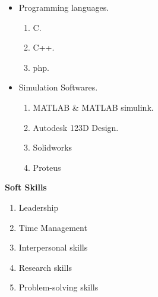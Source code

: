 \documentclass[11pt]{article}
\begin{document}
\begin{itemize}
\vspace{-0.60in}	                                     		\addtolength{\itemindent}{1in}	                                     \item Programming languages.
{\begin{enumerate}
\addtolength{\itemindent}{1.359in}                             		\item C.
\item C++.
\item php.
\end{enumerate}
}
\item  Simulation Softwares.
{\begin{enumerate}
\addtolength{\itemindent}{1.359in}                             		\item MATLAB \& MATLAB simulink.
\item Autodesk 123D Design.
\item Solidworks 
\item Proteus
\end{enumerate}
}
\end{itemize}

\begin{flushleft}
\Large \textbf{Soft Skills}\small
\begin{flushright} 
\begin{enumerate}
\addtolength{\itemindent}{1.359in}  
\item Leadership
\item Time Management	
\item Interpersonal skills
\item Research skills 
\item Problem-solving skills
\end{enumerate} 
\end{flushright}
\end{flushleft}	
	                                     		
\end{document}
